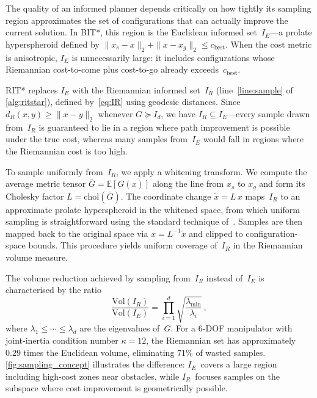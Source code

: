 \documentclass[journal]{IEEEtran}
\newcommand{\IR}{I_{\!R}}
\newcommand{\IE}{I_{\!E}}
\newcommand{\dR}{d_{\!R}}
\newcommand{\Vol}{\mathrm{Vol}}
\begin{document}
The quality of an informed planner depends critically on how tightly
its sampling region approximates the set of configurations that can
actually improve the current solution.
In BIT*, this region is the Euclidean informed set~$\IE$---a prolate
hyperspheroid defined by $\|x_s - x\|_2 + \|x - x_g\|_2 \le
c_{\mathrm{best}}$.
When the cost metric is anisotropic, $\IE$ is unnecessarily large:
it includes configurations whose Riemannian cost-to-come plus
cost-to-go already exceeds~$c_{\mathrm{best}}$.

RIT* replaces $\IE$ with the Riemannian informed set~$\IR$
(line~\ref{line:sample} of \cref{alg:ritstar}), defined
by~\eqref{eq:IR} using geodesic distances.
Since $\dR(x,y) \ge \|x-y\|_2$ whenever $G \succeq I_d$, we have
$\IR \subseteq \IE$---every sample drawn from~$\IR$ is guaranteed
to lie in a region where path improvement is possible under the true
cost, whereas many samples from~$\IE$ would fall in regions where
the Riemannian cost is too high.

To sample uniformly from~$\IR$, we apply a whitening transform.
We compute the average metric tensor
$\bar{G} = \mathbb{E}[G(x)]$ along the line from $x_s$ to $x_g$ and
form its Cholesky factor $L = \mathrm{chol}(\bar{G})$.
The coordinate change $\tilde{x} = L\, x$ maps~$\IR$ to an
approximate prolate hyperspheroid in the whitened space, from which
uniform sampling is straightforward using the standard technique
of~\cite{Gammell2018}.
Samples are then mapped back to the original space via
$x = L^{-1}\tilde{x}$ and clipped to configuration-space bounds.
This procedure yields uniform coverage of~$\IR$ in the Riemannian
volume measure.

The volume reduction achieved by sampling from~$\IR$ instead
of~$\IE$ is characterised by the ratio
\begin{equation}\label{eq:vol_ratio}
  \frac{\Vol(\IR)}{\Vol(\IE)}
  = \prod_{i=1}^{d} \sqrt{\frac{\lambda_{\min}}{\lambda_i}}\,,
\end{equation}
where $\lambda_1 \le \cdots \le \lambda_d$ are the eigenvalues
of~$G$.
For a 6-DOF manipulator with joint-inertia condition number
$\kappa = 12$, the Riemannian set has approximately $0.29$ times
the Euclidean volume, eliminating 71\% of wasted samples.
\cref{fig:sampling_concept} illustrates the difference:
$\IE$~covers a large region including high-cost zones near obstacles,
while $\IR$~focuses samples on the subspace where cost improvement
is geometrically possible.
\end{document}

